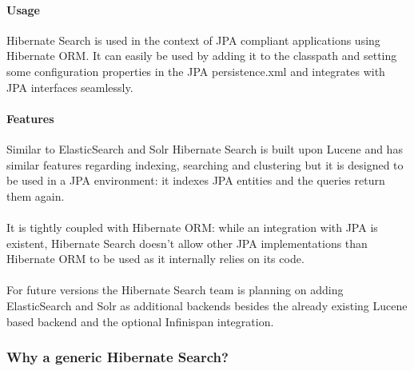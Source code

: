 \paragraph{Usage}
Hibernate Search is used in the context of JPA compliant applications using Hibernate ORM. It can easily be used by adding it to the classpath and setting some configuration properties in the JPA persistence.xml and integrates with JPA interfaces seamlessly. 

\paragraph{Features}
Similar to ElasticSearch and Solr Hibernate Search is built upon Lucene and has similar features regarding indexing, searching and clustering but it is designed to be used in a JPA environment: it indexes JPA entities and the queries return them again.
\\\\
It is tightly coupled with Hibernate ORM: while an integration with JPA is existent, Hibernate Search doesn't allow other JPA implementations than Hibernate ORM to be used as it internally relies on its code.
\\\\
For future versions the Hibernate Search team is planning on adding ElasticSearch and Solr as additional backends besides the already existing Lucene based backend and the optional Infinispan integration.

\pagebreak

\subsubsection{Why a generic Hibernate Search?}

